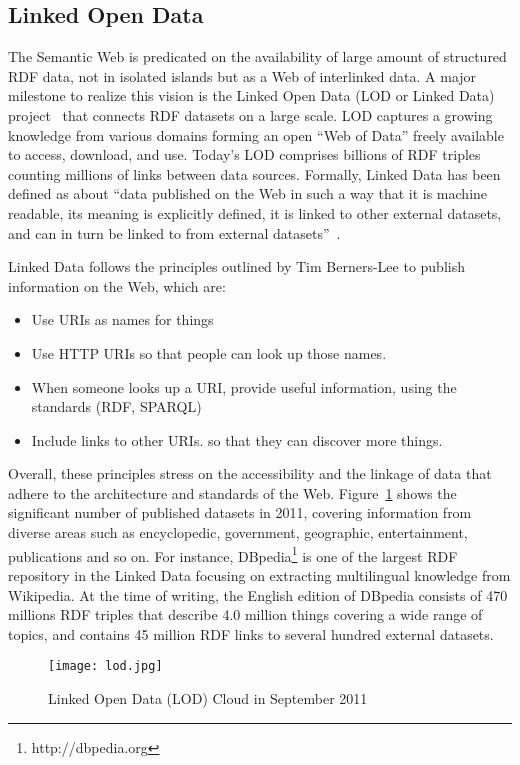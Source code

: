 \subsection{Linked Open Data}

The Semantic Web is predicated on the availability of large amount of structured RDF data, not in isolated islands but as a Web of interlinked data. A major milestone to realize this vision is the Linked Open Data (LOD or Linked Data) project~\cite{LOD:2011} that connects RDF datasets on a large scale. LOD captures a growing knowledge from various domains forming an open ``Web of Data'' freely available to access, download, and use. Today's LOD comprises billions of RDF triples counting millions of links between data sources. Formally, Linked Data has been defined as about ``data published on the Web in such a way that it is machine readable, its meaning is explicitly defined, it is linked to other external datasets, and can in turn be linked to from external datasets''~\cite{Bizer:HB09}. 
  
Linked Data follows the principles outlined by Tim Berners-Lee to publish information on the Web, which are:

\begin{itemize}
\item Use URIs as names for things
\item Use HTTP URIs so that people can look up those names.
\item When someone looks up a URI, provide useful information, using the standards (RDF, SPARQL)
\item Include links to other URIs. so that they can discover more things.
\end{itemize}

Overall, these principles stress on the accessibility and the linkage of data that adhere to the architecture and standards of the Web. Figure~\ref{fig:lod} shows the significant number of published datasets in 2011, covering information from diverse areas such as encyclopedic, government, geographic, entertainment, publications and so on.  For instance, DBpedia\footnote{http://dbpedia.org} is one of the largest RDF repository in the Linked Data focusing on extracting multilingual knowledge from Wikipedia. At the time of writing, the English edition of DBpedia consists of 470 millions RDF triples that describe 4.0 million things covering a wide range of topics, and contains 45 million RDF links to several hundred external datasets.

 \begin{figure}[htbp]
   \centering
  \texttt{[image: lod.jpg]}
  \caption{Linked Open Data (LOD) Cloud in September 2011}
  \label{fig:lod}
 \end{figure} 


